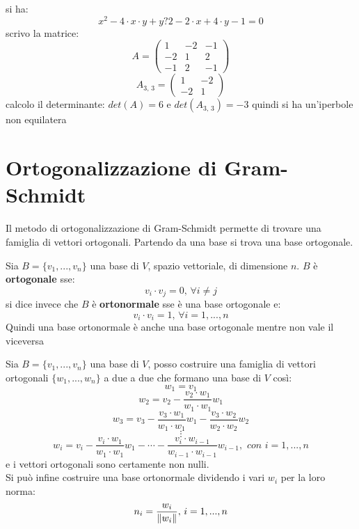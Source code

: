 \documentclass[a4paper,12pt, oneside]{book}
\begin{document}
\begin{esercizio}
	si ha:
	$$x^2-4\cdot x\cdot y+y?2-2\cdot x+4\cdot y-1=0$$
	scrivo la matrice:
	$$
		A=\left(\begin{matrix}
				1  & -2 & -1 \\
				-2 & 1  & 2  \\
				-1 & 2  & -1
			\end{matrix}\right)
	$$
	$$
		A_{3,\,3}=\left(\begin{matrix}
				1  & -2 \\
				-2 & 1
			\end{matrix}\right)
	$$
	calcolo il determinante: $det(A)=6$ e $det(A_{3,\,3})=-3$ quindi si ha un'iperbole non equilatera
\end{esercizio}
\section{Ortogonalizzazione di Gram-Schmidt}
Il metodo di ortogonalizzazione di Gram-Schmidt permette di trovare una famiglia di vettori ortogonali. Partendo da una base si trova una base ortogonale.
\begin{definizione}
	Sia $B=\{v_1,...,v_n\}$ una base di $V$, spazio vettoriale, di dimensione $n$. $B$ è \textbf{ortogonale} sse:
	$$v_i\cdot v_j=0,\, \forall i\neq j$$
	si dice invece che $B$ è \textbf{ortonormale} sse è una base ortogonale e:
	$$v_i\cdot v_i=1,\,\forall i=1,...,n$$
	Quindi una base ortonormale è anche una base ortogonale mentre non vale il viceversa
\end{definizione}
\begin{teorema}
	Sia $B=\{v_1,...,v_n\}$ una base di $V$, posso costruire una famiglia di vettori ortogonali $\{w_1,...,w_n\}$ a due a due che formano una base di $V$ così:
	$$w_1=v_1$$
	$$w_2=v_2-\frac{v_2\cdot w_1}{w_1\cdot w_1}w_1$$
	$$w_3=v_3-\frac{v_3\cdot w_1}{w_1\cdot w_1}w_1-\frac{v_3\cdot w_2}{w_2\cdot w_2}w_2$$
	$$\vdots$$
	$$w_i=v_i-\frac{v_i\cdot w_1}{w_1\cdot w_1}w_1-\cdots-\frac{v_i\cdot w_{i-1}}{w_{i-1}\cdot w_{i-1}}w_{i-1},\,\, con\,\, i=1,...,n$$
	e i vettori ortogonali sono certamente non nulli.\\
	Si può infine costruire una base ortonormale dividendo i vari $w_i$ per la loro norma:
	$$n_i=\frac{w_i}{\left\lVert {w_i} \right\rVert},\, i=1,...,n$$
\end{teorema}
\end{document}
